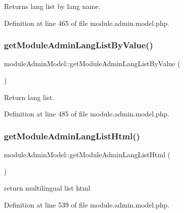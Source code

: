 Returns lang list by lang name. 



Definition at line 465 of file module.\+admin.\+model.\+php.

\hypertarget{classmoduleAdminModel_acd8e42367271f853d4da4388fe15b0d1}{}\label{classmoduleAdminModel_acd8e42367271f853d4da4388fe15b0d1} 
\subsubsection{\texorpdfstring{get\+Module\+Admin\+Lang\+List\+By\+Value()}{getModuleAdminLangListByValue()}}
{\footnotesize\ttfamily module\+Admin\+Model\+::get\+Module\+Admin\+Lang\+List\+By\+Value (\begin{DoxyParamCaption}{ }\end{DoxyParamCaption})}



Return lang list. 



Definition at line 485 of file module.\+admin.\+model.\+php.

\hypertarget{classmoduleAdminModel_a1f3f518448a54604d56032927b4ef957}{}\label{classmoduleAdminModel_a1f3f518448a54604d56032927b4ef957} 
\subsubsection{\texorpdfstring{get\+Module\+Admin\+Lang\+List\+Html()}{getModuleAdminLangListHtml()}}
{\footnotesize\ttfamily module\+Admin\+Model\+::get\+Module\+Admin\+Lang\+List\+Html (\begin{DoxyParamCaption}{ }\end{DoxyParamCaption})}

return multilingual list html 

Definition at line 539 of file module.\+admin.\+model.\+php.

\hypertarget{classmoduleAdminModel_a205c97c3919ee573047431c8c2a0e1a7}{}\label{classmoduleAdminModel_a205c97c3919ee573047431c8c2a0e1a7} 
